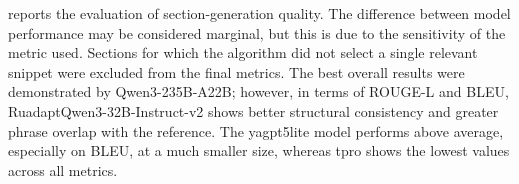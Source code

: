 \documentclass{superfri}
\begin{document}

 reports the evaluation of section-generation quality. The difference between model performance may be considered marginal, but this is due to the sensitivity of the metric used.
Sections for which the algorithm did not select a single relevant snippet were excluded from the final metrics. The best overall results
were demonstrated by Qwen3-\allowbreak 235B-\allowbreak A22B; however, in terms of ROUGE-\allowbreak L and BLEU, RuadaptQwen3-\allowbreak 32B-\allowbreak Instruct-v2 shows better structural consistency and
greater phrase overlap with the reference.
The yagpt5lite model performs above average, especially on BLEU, at a much smaller size, whereas tpro shows the lowest values across all metrics.
\end{document}
